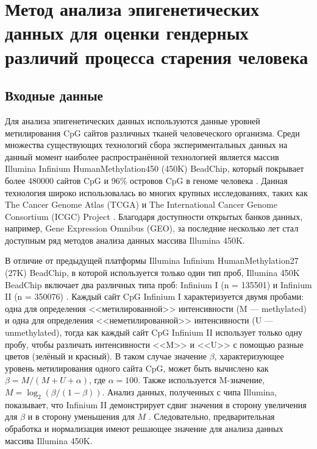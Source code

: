 \chapter{Метод анализа эпигенетических данных для оценки гендерных различий процесса старения человека}\label{ch:ch2}

\section{Входные данные}\label{sec:ch2/sec1}

Для анализа эпигенетических данных используются данные уровней метилирования CpG сайтов различных тканей человеческого организма. Среди множества существующих технологий сбора экспериментальных данных на данный момент наиболее распространённой технологией является массив Illumina Infinium HumanMethylation450 (450K) BeadChip, который покрывает более 480000 сайтов CpG и 96\% островов CpG в геноме человека \autocite{Bibikova2011}. Данная технология широко использовалась во многих крупных исследованиях, таких как The Cancer Genome Atlas (TCGA) и The International Cancer Genome Consortium (ICGC) Project \autocite{ICGC2010}. Благодаря доступности открытых банков данных, например, Gene Expression Omnibus (GEO), за последние несколько лет стал доступным ряд методов анализа данных массива Illumina 450K.

В отличие от предыдущей платформы Illumina Infinium HumanMethylation27 (27K) BeadChip, в которой используется только один тип проб, Illumina 450K BeadChip включает два различных типа проб: Infinium I (n = 135501) и Infinium II (n = 350076) \autocite{Bibikova2011}. Каждый сайт CpG Infinium I характеризуется двумя пробами: одна для определения <<метилированной>> интенсивности (M --- methylated) и одна для определения <<неметилированной>> интенсивности (U --- unmethylated), тогда как каждый сайт CpG Infinium II использует только одну пробу, чтобы различать интенсивности <<M>> и <<U>> с помощью разные цветов (зелёный и красный). В таком случае значение $\beta$, характеризующее уровень метилирования одного сайта CpG, может быть вычислено как $\beta = M / (M + U + \alpha)$, где $\alpha = 100$. Также используется M-значение, $M = \log_2 (\beta / (1-\beta))$. Анализ данных, полученных с чипа Illumina, показывает, что Infinium II демонстрирует сдвиг значения в сторону увеличения для $\beta$ и в сторону уменьшения для $M$ \autocite{Dedeurwaerder2011}. Следовательно, предварительная обработка и нормализация имеют решающее значение для анализа данных массива Illumina 450K. 

